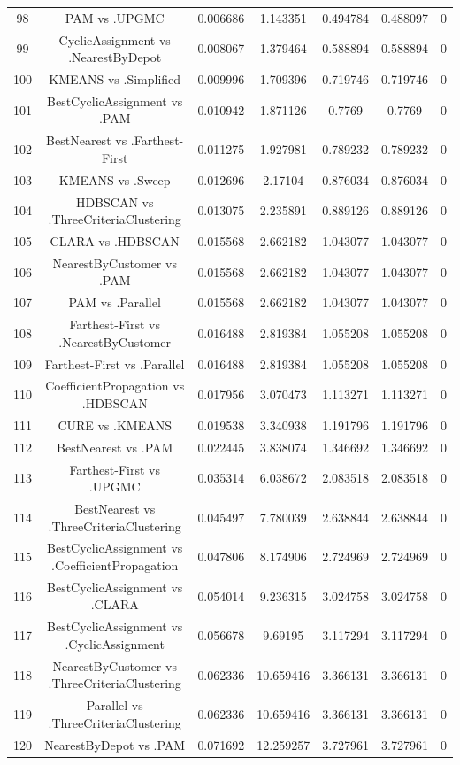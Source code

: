 \documentclass[a4paper,10pt]{article}
\begin{document}
\begin{landscape}
\begin{table}[!htp]
\begin{tabular}{ccccccc}
98&PAM vs .UPGMC&0.006686&1.143351&0.494784&0.488097&0\\
99&CyclicAssignment vs .NearestByDepot&0.008067&1.379464&0.588894&0.588894&0\\
100&KMEANS vs .Simplified&0.009996&1.709396&0.719746&0.719746&0\\
101&BestCyclicAssignment vs .PAM&0.010942&1.871126&0.7769&0.7769&0\\
102&BestNearest vs .Farthest-First&0.011275&1.927981&0.789232&0.789232&0\\
103&KMEANS vs .Sweep&0.012696&2.17104&0.876034&0.876034&0\\
104&HDBSCAN vs .ThreeCriteriaClustering&0.013075&2.235891&0.889126&0.889126&0\\
105&CLARA vs .HDBSCAN&0.015568&2.662182&1.043077&1.043077&0\\
106&NearestByCustomer vs .PAM&0.015568&2.662182&1.043077&1.043077&0\\
107&PAM vs .Parallel&0.015568&2.662182&1.043077&1.043077&0\\
108&Farthest-First vs .NearestByCustomer&0.016488&2.819384&1.055208&1.055208&0\\
109&Farthest-First vs .Parallel&0.016488&2.819384&1.055208&1.055208&0\\
110&CoefficientPropagation vs .HDBSCAN&0.017956&3.070473&1.113271&1.113271&0\\
111&CURE vs .KMEANS&0.019538&3.340938&1.191796&1.191796&0\\
112&BestNearest vs .PAM&0.022445&3.838074&1.346692&1.346692&0\\
113&Farthest-First vs .UPGMC&0.035314&6.038672&2.083518&2.083518&0\\
114&BestNearest vs .ThreeCriteriaClustering&0.045497&7.780039&2.638844&2.638844&0\\
115&BestCyclicAssignment vs .CoefficientPropagation&0.047806&8.174906&2.724969&2.724969&0\\
116&BestCyclicAssignment vs .CLARA&0.054014&9.236315&3.024758&3.024758&0\\
117&BestCyclicAssignment vs .CyclicAssignment&0.056678&9.69195&3.117294&3.117294&0\\
118&NearestByCustomer vs .ThreeCriteriaClustering&0.062336&10.659416&3.366131&3.366131&0\\
119&Parallel vs .ThreeCriteriaClustering&0.062336&10.659416&3.366131&3.366131&0\\
120&NearestByDepot vs .PAM&0.071692&12.259257&3.727961&3.727961&0\\

\end{tabular}
\end{table}
\end{landscape}
\end{document}
